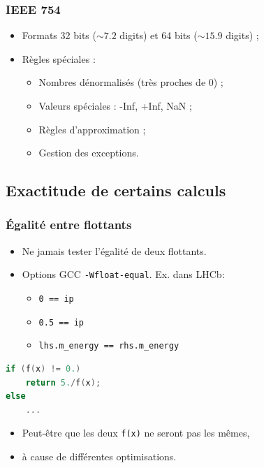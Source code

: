 \documentclass{beamer}
\begin{document}
\begin{frame}
    \frametitle{IEEE 754}

    \begin{itemize}
        \item Formats 32 bits ($\sim 7.2$ digits) et 64 bits ($\sim 15.9$ digits) ;
        \item Règles spéciales :
              \begin{itemize}
                  \item Nombres dénormalisés (très proches de $0$) ;
                  \item Valeurs spéciales : -Inf, +Inf, NaN ;
                  \item Règles d'approximation ;
                  \item Gestion des exceptions.
              \end{itemize}
    \end{itemize}
\end{frame}

\subsection{Exactitude de certains calculs}

\begin{frame}[fragile]
    \frametitle{Égalité entre flottants}

    \begin{itemize}
        \item Ne jamais tester l'égalité de deux flottants.
        \item Options GCC \verb'-Wfloat-equal'.
              Ex. dans LHCb:
              \begin{itemize}
                  \item \verb'0 == ip'
                  \item \verb'0.5 == ip'
                  \item \verb'lhs.m_energy == rhs.m_energy'
              \end{itemize}
    \end{itemize}
\end{frame}

\begin{frame}[fragile]
    \begin{lstlisting}[language=c++]
if (f(x) != 0.)
    return 5./f(x);
else
    ...
    \end{lstlisting}

    \begin{itemize}
        \item Peut-être que les deux \verb'f(x)' ne seront pas les mêmes,
        \item à cause de différentes optimisations.
    \end{itemize}
\end{frame}
\end{document}
